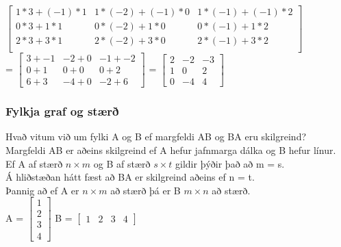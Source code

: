 $\begin{bmatrix}
    1*3 + (-1)*1 & 1*(-2) + (-1)*0 & 1*(-1) + (-1)*2 \\
    0*3 + 1*1 & 0*(-2) + 1*0 & 0*(-1) + 1*2 \\
    2*3 + 3*1 & 2*(-2) + 3*0 & 2*(-1) + 3*2 \\
\end{bmatrix}$ \vspace*{0.7em} \\ =  
$\begin{bmatrix}
    3 + -1 & -2 + 0 & -1 + -2 \\
    0+1 & 0+0 & 0+2 \\
    6+3 & -4+0 & -2+6
\end{bmatrix}$ = 
$\begin{bmatrix}
    2 & -2 & -3 \\
    1 & 0 & 2 \\
    0 & -4 & 4
\end{bmatrix}$
\newpage
\subsubsection{Fylkja graf og stærð}
Hvað vitum við um fylki A og B ef margfeldi AB og BA eru skilgreind?\\
Margfeldi AB er aðeins skilgreind ef A hefur jafnmarga dálka og B hefur línur.\\
Ef A af stærð $n \times m$ og B af stærð $s \times t$ gildir þýðir það að m = s.\\
Á hliðstæðan hátt fæst að BA er skilgreind aðeins ef n = t.\\
Þannig að ef A er $n \times m$ að stærð þá er B $m \times n$ að stærð.\\
A = 
$\begin{bmatrix}
    1 \\
    2 \\
    3 \\
    4
\end{bmatrix}$ B = 
$\begin{bmatrix}
    1 & 2 & 3 & 4
\end{bmatrix}$

